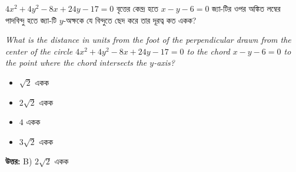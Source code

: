 \documentclass[12pt, a4paper]{article}
\begin{document}
\begin{tcolorbox}[questionbox={প্রশ্ন (Question) 16}]
    \noindent
    $4x^2 + 4y^2 - 8x + 24y - 17 = 0$ বৃত্তের কেন্দ্র হতে $x - y - 6 = 0$ জ্যা-টির ওপর অঙ্কিত লম্বের পাদবিন্দু হতে জ্যা-টি $y$-অক্ষকে যে বিন্দুতে ছেদ করে তার দূরত্ব কত একক?
    
    \vspace{0.8em}
    \begin{english}
    \noindent\textit{\color{darkgray}
    What is the distance in units from the foot of the perpendicular drawn from the center of the circle $4x^2 + 4y^2 - 8x + 24y - 17 = 0$ to the chord $x - y - 6 = 0$ to the point where the chord intersects the $y$-axis?
    }
    \end{english}
\end{tcolorbox}

\begin{itemize}[label={}, leftmargin=1cm, itemsep=0.5em]
    \item[\textbf{A)}] $\sqrt{2}$ একক
    \item[\textbf{B)}] $2\sqrt{2}$ একক
    \item[\textbf{C)}] $4$ একক
    \item[\textbf{D)}] $3\sqrt{2}$ একক
\end{itemize}

\vspace{0.5em}
\begin{tcolorbox}[answerbox]
    \textbf{\color{success} উত্তর:} B) $2\sqrt{2}$ একক
\end{tcolorbox}
\vspace{1em}
\end{document}
